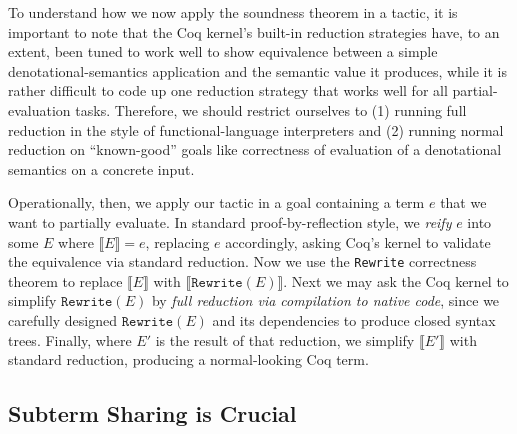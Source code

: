 To understand how we now apply the soundness theorem in a tactic, it is important to note that the Coq kernel's built-in reduction strategies have, to an extent, been tuned to work well to show equivalence between a simple denotational-semantics application and the semantic value it produces, while it is rather difficult to code up one reduction strategy that works well for all partial-evaluation tasks.
Therefore, we should restrict ourselves to (1) running full reduction in the style of functional-language interpreters and (2) running normal reduction on ``known-good'' goals like correctness of evaluation of a denotational semantics on a concrete input.

Operationally, then, we apply our tactic in a goal containing a term $e$ that we want to partially evaluate.
In standard proof-by-reflection style, we \emph{reify} $e$ into some $E$ where $\llbracket E \rrbracket = e$, replacing $e$ accordingly, asking Coq's kernel to validate the equivalence via standard reduction.
Now we use the \texttt{Rewrite} correctness theorem to replace $\llbracket E \rrbracket$ with $\llbracket \texttt{Rewrite}(E) \rrbracket$.
Next we may ask the Coq kernel to simplify $\texttt{Rewrite}(E)$ by \emph{full reduction via compilation to native code}, since we carefully designed $\texttt{Rewrite}(E)$ and its dependencies to produce closed syntax trees.
Finally, where $E'$ is the result of that reduction, we simplify $\llbracket E' \rrbracket$ with standard reduction, producing a normal-looking Coq term.


\subsection{Subterm Sharing is Crucial} \label{sec:under-lets}

